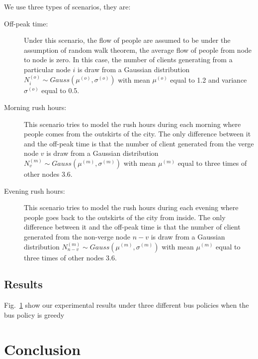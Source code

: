 \documentclass{sig-alternate}
\begin{document}
We use three types of scenarios, they are: 

\begin{description}
\item [Off-peak time:] Under this scenario, the flow of people are assumed to be under the assumption of random walk theorem, the average flow of people from node to node is zero. In this case, the number of clients generating from a particular node $i$ is draw from a Gaussian distribution $N_{i}^{(o)} \sim Gauss(\mu^{(o)},\sigma^{(o)})$ with mean $\mu^{(o)}$ equal to 1.2 and variance $\sigma^{(o)}$ equal to 0.5.
\item [Morning rush hours:] This scenario tries to model the rush hours during each morning where people comes from the outskirts of the city. The only difference between it and the off-peak time is that the number of client generated from the verge node $v$ is draw from a Gaussian distribution $N_{v}^{(m)} \sim Gauss(\mu^{(m)},\sigma^{(m)})$ with mean $\mu^{(m)}$ equal to three times of other nodes 3.6.
\item [Evening rush hours:] This scenario tries to model the rush hours during each evening where people goes back to the outskirts of the city from inside. The only difference between it and the off-peak time is that the number of client generated from the non-verge node $n-v$ is draw from a Gaussian distribution $N_{n-v}^{(m)} \sim Gauss(\mu^{(m)},\sigma^{(m)})$ with mean $\mu^{(m)}$ equal to three times of other nodes 3.6.
\end{description} 

\subsection{Results}
Fig.~\ref{} show our experimental results under three different bus policies when the bus policy is greedy


\section{Conclusion}
\end{document}
